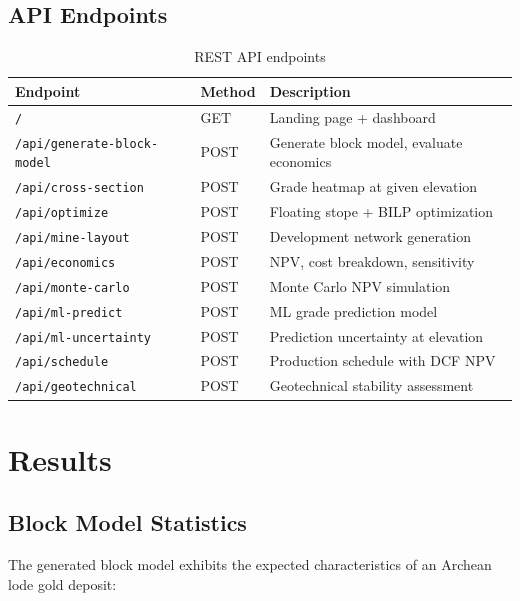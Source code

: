 \documentclass[12pt,a4paper]{article}
\begin{document}
\subsection{API Endpoints}

\begin{table}[H]
\centering
\caption{REST API endpoints}
\small
\begin{tabular}{@{}lll@{}}
\toprule
\textbf{Endpoint} & \textbf{Method} & \textbf{Description} \\
\midrule
\texttt{/} & GET & Landing page + dashboard \\
\texttt{/api/generate-block-model} & POST & Generate block model, evaluate economics \\
\texttt{/api/cross-section} & POST & Grade heatmap at given elevation \\
\texttt{/api/optimize} & POST & Floating stope + BILP optimization \\
\texttt{/api/mine-layout} & POST & Development network generation \\
\texttt{/api/economics} & POST & NPV, cost breakdown, sensitivity \\
\texttt{/api/monte-carlo} & POST & Monte Carlo NPV simulation \\
\texttt{/api/ml-predict} & POST & ML grade prediction model \\
\texttt{/api/ml-uncertainty} & POST & Prediction uncertainty at elevation \\
\texttt{/api/schedule} & POST & Production schedule with DCF NPV \\
\texttt{/api/geotechnical} & POST & Geotechnical stability assessment \\
\bottomrule
\end{tabular}
\end{table}

\section{Results}
\label{sec:results}

\subsection{Block Model Statistics}

The generated block model exhibits the expected characteristics of an Archean lode gold deposit:
\end{document}
